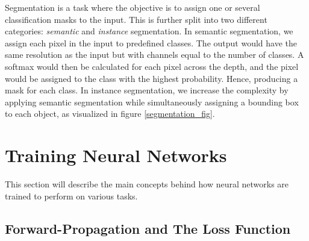     Segmentation is a task where the objective is to assign one or several classification masks to the input\cite{He_2017_ICCV_segmentation}. This is further split into two different categories: \textit{semantic} and \textit{instance} segmentation. In semantic segmentation, we assign each pixel in the input to predefined classes. The output would have the same resolution as  the input but with channels equal to the number of classes. A softmax would then be calculated for each pixel across the depth, and the pixel would be assigned to the class with the highest probability. Hence, producing a mask for each class. In instance segmentation, we increase the complexity by applying semantic segmentation while simultaneously assigning a bounding box to each object, as visualized in figure \ref{segmentation_fig}.
    
\section{Training Neural Networks} \label{training neural networks}
    This section will describe the main concepts behind how neural networks are trained to perform on various tasks. 

\subsection{Forward-Propagation and The Loss Function}

